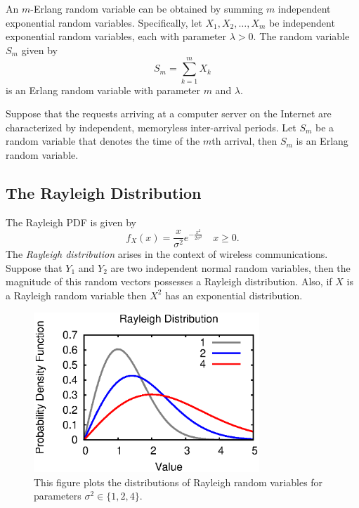 An $m$-Erlang random variable can be obtained by summing $m$ independent exponential random variables.
Specifically, let $X_1, X_2, \ldots, X_m$ be independent exponential random variables, each with parameter $\lambda > 0$.
The random variable $S_m$ given by
\begin{equation*}
S_m = \sum_{k=1}^m X_k
\end{equation*}
is an Erlang random variable with parameter $m$ and $\lambda$.

\begin{example}
Suppose that the requests arriving at a computer server on the Internet are characterized by independent, memoryless inter-arrival periods.
Let $S_m$ be a random variable that denotes the time of the $m$th arrival, then $S_m$ is an Erlang  random variable.
\end{example}


\subsection{The Rayleigh Distribution}

The Rayleigh PDF is given by 
\begin{equation*}
f_X (x) = \frac{x}{\sigma^2} e^{- \frac{x^2}{2 \sigma^2} } \quad x \geq 0 .
\end{equation*}
The \emph{Rayleigh distribution} arises in the context of wireless communications.
Suppose that $Y_1$ and $Y_2$ are two independent normal random variables, then the  magnitude of this random vectors possesses a Rayleigh distribution.
Also, if $X$ is a Rayleigh random variable then $X^2$ has an exponential distribution.

\begin{figure}[ht]
\begin{center}
\includegraphics[width=8.5cm]{Figures/8chapter/rayleigh_pdf}
\end{center}
\caption{This figure plots the distributions of Rayleigh random variables for parameters $\sigma^2 \in \{ 1, 2, 4 \}$.}
\end{figure}

